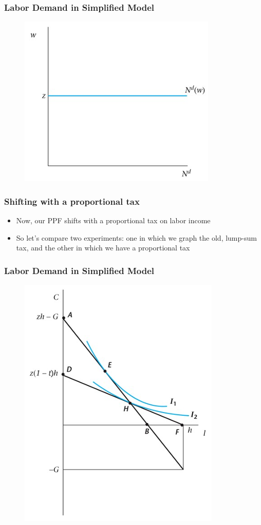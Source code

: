 \documentclass{beamer}
\begin{document}
\begin{frame}
\frametitle[alignment=center]{Labor Demand in Simplified Model}
\begin{figure}
\centering
\includegraphics[scale=0.5]{Figures/W_Fig_5pt15.png}
\end{figure}
\end{frame}


\begin{frame}
\frametitle[alignment=center]{Shifting with a proportional tax}
\begin{itemize}
\item Now, our PPF shifts with a proportional tax on labor income
\bigskip
\item So let's compare two experiments:  one in which we graph the old, lump-sum tax, and the other in which we have a proportional tax
\end{itemize}
\end{frame}

\begin{frame}
\frametitle[alignment=center]{Labor Demand in Simplified Model}
\begin{figure}
\centering
\includegraphics[scale=0.5]{Figures/W_Fig_5pt16.png}
\end{figure}
\end{frame}
\end{document}
